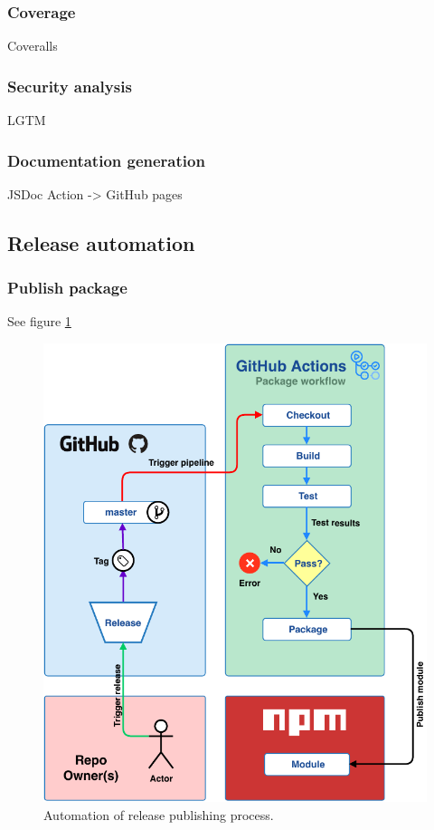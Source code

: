 \subsubsection{Coverage}
Coveralls
\subsubsection{Security analysis}
LGTM
\subsubsection{Documentation generation}
JSDoc Action -> GitHub pages

\subsection{Release automation}

\subsubsection{Publish package}
See figure \ref{fig:release-automation}
\begin{figure}[h]
    \setlength{\abovecaptionskip}{25pt}
    \centering
    \includegraphics[page=1,scale=1]{sections/methodology/figures/package-release-automation.pdf}
    \caption{Automation of release publishing process.}
    \label{fig:release-automation}
\end{figure}

